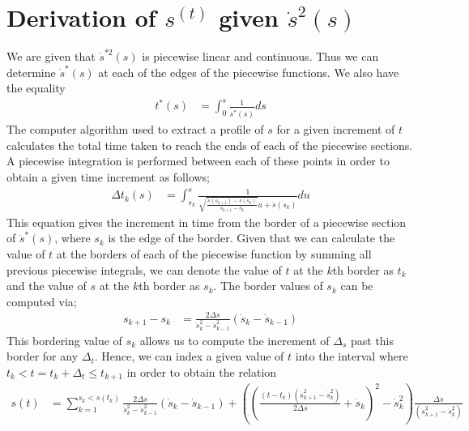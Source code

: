 \chapter{Derivation of $s^(t)$ given $\dot{s}^{2}(s)$}
We are given that $\dot{s}^{*2}(s)$ is piecewise linear and continuous. Thus we can determine $\dot{s}^*(s)$ at each of the edges of the piecewise functions. We also have the equality
\begin{align*}
t^*(s) &= \int^s_0\frac{1}{\dot{s^*}(s)}ds
\end{align*} 
The computer algorithm used to extract a profile of $s$ for a given increment of $t$ calculates the total time taken to reach the ends of each of the piecewise sections. A piecewise integration is performed between each of these points in order to obtain a given time increment as follows;
\begin{align*}
\Delta t_k(s) &= \int_{s_k}^s \frac{1}{\sqrt{\frac{\dot{s}(s_{k+1}) - \dot{s}(s_{k})}{s_{k+1} - s_{k}}} u + \dot{s}(s_{k})} du
\end{align*}
This equation gives the increment in time from the border of a piecewise section of $\dot{s}^*(s)$, where $s_k$ is the edge of the border.
Given that we can calculate the value of $t$ at the borders of each of the piecewise function by summing all previous piecewise integrals, we can denote the value of $t$ at the $k$th border as $t_k$ and the value of $s$ at the $k$th border as $s_k$. The border values of $s_k$ can be computed via;
\begin{align*}
s_{k+1} - s_k &= \frac{2\Delta s}{\dot{s}^2_k - \dot{s}^2_{k-1}} \left(\dot{s}_k -\dot{s}_{k-1}\right)
\end{align*}
This bordering value of $s_k$ allows us to compute the increment of $\Delta_s$ past this border for any $\Delta_t$. Hence, we can index a given value of $t$ into the interval where $t_k < t = t_k + \Delta_t \leq t_{k+1}$ in order to obtain the relation
\begin{align*}
s(t) &= \sum_{k=1}^{s_k < s(t_k)} \frac{2\Delta s}{\dot{s}^2_k - \dot{s}^2_{k-1}} \left(\dot{s}_k -\dot{s}_{k-1}\right) + \left(\left(\frac{(t-t_{k})(\dot{s}^2_{k+1} - \dot{s}^2_{k})}{2 \Delta s} + \dot{s}_k\right)^2 - \dot{s}^2_k \right)\frac{\Delta s}{(\dot{s}^2_{k+1} - \dot{s}^2_{k})}\\	
\end{align*}